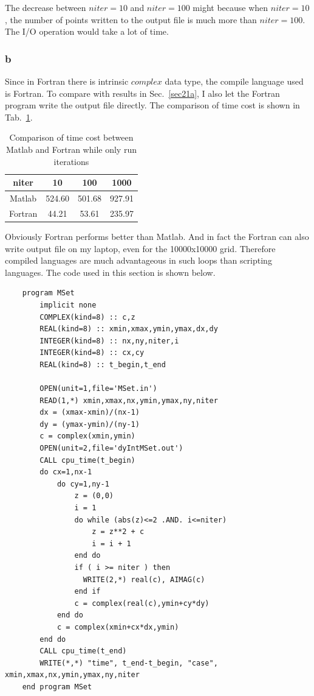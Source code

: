 \documentclass[letterpaper,10pt]{article}
\begin{document}
The decrease between $niter = 10$ and $niter = 100$ might because when $niter = 10$, 
the number of points written to the output file is much more than $niter = 100$. The I/O operation would 
take a lot of time. 

\subsubsection{b}\label{sec21b}
Since in Fortran there is intrinsic $complex$ data type, the compile language used is Fortran. 
To compare with results in Sec.~\ref{sec21a}, I also let the Fortran program write the output file directly. 
The comparison of time cost is shown in Tab.~\ref{tabComMF}.
\begin{table}
\centering  
\caption{Comparison of time cost between Matlab and Fortran while only run iterations}\label{tabComMF}
\begin{tabular}{cccc}
  \hline
  niter & 10 & 100 & 1000 \\
  \hline
  Matlab & 524.60 & 501.68 & 927.91 \\
  Fortran & 44.21 & 53.61 & 235.97 \\
  \hline
\end{tabular}
\end{table}

Obviously Fortran performs better than Matlab. And in fact the Fortran can also write output file on 
my laptop, even for the 10000x10000 grid. Therefore compiled languages are much advantageous in such 
loops than scripting languages. The code used in this section is shown below. 
{\small\begin{framed}
  \begin{lstlisting}
    program MSet
        implicit none
        COMPLEX(kind=8) :: c,z
        REAL(kind=8) :: xmin,xmax,ymin,ymax,dx,dy
        INTEGER(kind=8) :: nx,ny,niter,i
        INTEGER(kind=8) :: cx,cy
        REAL(kind=8) :: t_begin,t_end

        OPEN(unit=1,file='MSet.in')
        READ(1,*) xmin,xmax,nx,ymin,ymax,ny,niter
        dx = (xmax-xmin)/(nx-1)
        dy = (ymax-ymin)/(ny-1)
        c = complex(xmin,ymin)
        OPEN(unit=2,file='dyIntMSet.out')
        CALL cpu_time(t_begin)
        do cx=1,nx-1
            do cy=1,ny-1
                z = (0,0)
                i = 1
                do while (abs(z)<=2 .AND. i<=niter)
                    z = z**2 + c
                    i = i + 1
                end do
                if ( i >= niter ) then
                  WRITE(2,*) real(c), AIMAG(c)
                end if
                c = complex(real(c),ymin+cy*dy)
            end do
            c = complex(xmin+cx*dx,ymin)
        end do
        CALL cpu_time(t_end)
        WRITE(*,*) "time", t_end-t_begin, "case", xmin,xmax,nx,ymin,ymax,ny,niter
    end program MSet
    \end{lstlisting}
\end{framed}}
\end{document}
